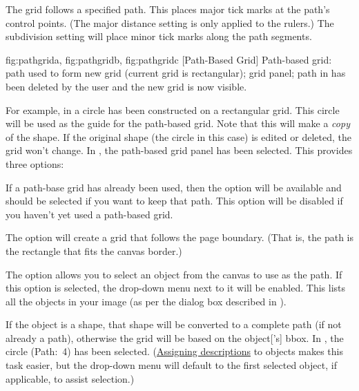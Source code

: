 
The  grid follows a specified path. This places major tick
marks at the path's control points. (The major distance setting is
only applied to the rulers.) The subdivision setting will place
minor tick marks along the path segments.

{
  {fig:pathgrida}{}{},
  {fig:pathgridb}{}{},
  {fig:pathgridc}{}{}
}
 [Path-Based Grid]
 {Path-based grid:
 path used to form new grid
(current grid is rectangular);
 grid panel;
 path in
 has been deleted by the user and the new grid is now
visible.}

For example, in  a circle has been
constructed on a rectangular grid. This circle will be used as the
guide for the path-based grid. Note that this will make a
\emph{copy} of the shape. If the original shape (the circle in this
case) is edited or deleted, the grid won't change.
In , the path-based grid panel has
been selected. This provides three options:


If a path-base grid has already been used, then the
 option will be available and should be
selected if you want to keep that path.  This option will be
disabled if you haven't yet used a path-based grid.


The  option will create a grid that
follows the page boundary. (That is, the path is the rectangle that
fits the \gls{canvas} border.)


The  option allows you to select an
\gls{object} from the \gls{canvas} to use as the path.  If this
option is selected, the drop-down menu next to it will be enabled.
This lists all the objects in your image (as per the
 dialog box described in
).

If the object is a \gls{shape}, that shape
will be converted to a complete \gls{path} (if not already a
\gls{path}), otherwise the grid will be based on the
\gls{object}['s] \gls{bbox}. In ,
the circle (Path:~4) has been selected.
(\hyperref[sec:objectdescription]{Assigning descriptions} to
\glspl{object} makes this task easier, but the drop-down menu will
default to the first selected \gls{object}, if applicable, to
assist selection.)

